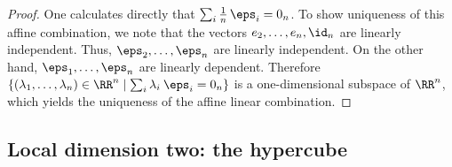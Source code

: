 \begin{proof}
One calculates directly that $\sum_i \frac{1}{n} \, \eps_i = 0_n$. To show uniqueness of this affine combination, we note that the vectors $e_2, \ldots, e_n, \id_n$ are linearly independent. Thus, $\eps_2, \ldots, \eps_n$ are linearly independent. On the other hand, $\eps_1,\ldots, \eps_n$ are linearly dependent. Therefore
	$
	\left\lbrace (\lambda_1,\ldots,\lambda_n) \in \RR^n \mid \sum_i \lambda_i \: \eps_i = 0_n \right\rbrace
	$
is a one-dimensional subspace of $\RR^n$, which yields the uniqueness of the affine linear combination.
\end{proof}



\subsection{Local dimension two: the hypercube}\label{sec:qubits}

